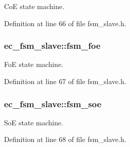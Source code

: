 Co\-E state machine. 



Definition at line 66 of file fsm\-\_\-slave.\-h.

\subsubsection[{fsm\-\_\-foe}]{ ec\-\_\-fsm\-\_\-slave\-::fsm\-\_\-foe}\label{structec__fsm__slave_ac4d096c83edc90e10998d0581ac2b90e}


Fo\-E state machine. 



Definition at line 67 of file fsm\-\_\-slave.\-h.

\subsubsection[{fsm\-\_\-soe}]{ ec\-\_\-fsm\-\_\-slave\-::fsm\-\_\-soe}\label{structec__fsm__slave_a631509da2c5d1a4ac23eecf89afea74e}


So\-E state machine. 



Definition at line 68 of file fsm\-\_\-slave.\-h.

